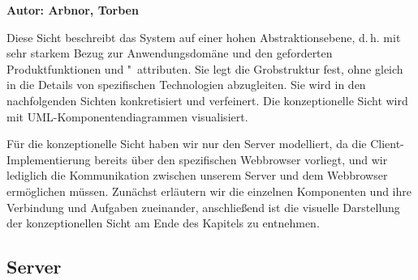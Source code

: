 
\textbf{Autor: Arbnor, Torben} \\
{ Diese Sicht beschreibt das System auf einer hohen 
  Abstraktionsebene, d.\,h. mit sehr starkem Bezug zur 
  Anwendungsdomäne und den geforderten Produktfunktionen und 
  "~attributen. Sie legt die Grobstruktur fest, ohne gleich in die 
  Details von spezifischen Technologien abzugleiten. Sie wird in den 
  nachfolgenden Sichten konkretisiert und verfeinert. Die 
  konzeptionelle Sicht wird mit {UML}-Komponentendiagrammen 
  visualisiert.
  
  Für die konzeptionelle Sicht haben wir nur den Server modelliert, da die Client-Implementierung bereits 
  über den spezifischen Webbrowser vorliegt, und wir lediglich die Kommunikation zwischen unserem Server und dem
  Webbrowser ermöglichen müssen. 
  Zunächst erläutern wir die einzelnen Komponenten und ihre Verbindung und Aufgaben zueinander, anschließend ist die
  visuelle Darstellung der konzeptionellen Sicht am Ende des Kapitels zu entnehmen.
  
}

\subsection{Server}

